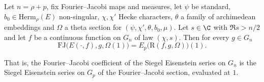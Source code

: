 \begin{proposition}\label{pf:liftinj:fj}
Let $n=\rho+p$, fix Fourier--Jacobi maps and measures, let $\psi$ be standard, $b_0\in\mathrm{Herm}_\rho(E)$ non-singular, $\chi,\chi'$ Hecke characters,
$\theta$ a family of archimedean embeddings and $\Omega$ a theta section for $(\psi,\chi',\theta,b_0,\mu)$. Let $s\in\C$ with $\Re s>n/2$ and let $f$
be a continuous function on $G_n$ of law $(\chi,s)$. Then for every $g\in G_n$
\[
\mathrm{FJ}\bigl(E(\cdot,f),g,\Omega(1)\bigr)=E_p\bigl(\mathrm R(f,g,\Omega)\bigr)(1).
\]
\end{proposition}

That is, the Fourier--Jacobi coefficient of the Siegel Eisenstein series on $G_n$ is the Siegel Eisenstein series on $G_p$ of the Fourier--Jacobi
section, evaluated at $1$.

